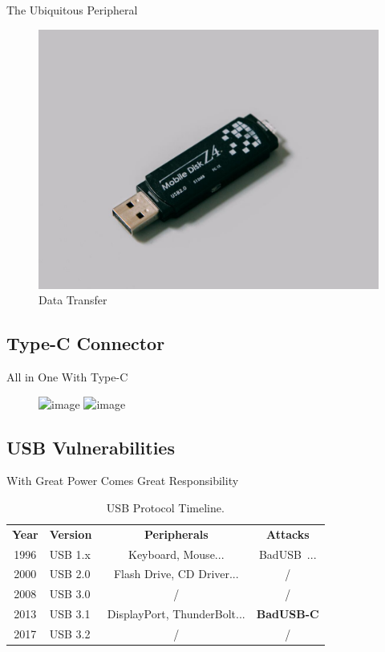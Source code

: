 \documentclass{beamer}
\begin{document}
\begin{frame}{The Ubiquitous Peripheral}
	\begin{figure}[htbp]
		\includegraphics[width=.7\textwidth]{Figs/flashdrive.jpg}
		\caption*{Data Transfer}
	\end{figure}
\end{frame}
\subsection{Type-C Connector}
\begin{frame}{All in One With Type-C}
\begin{figure}[htbp]
	\includegraphics<1>[width=.8\textwidth]{Figs/messy_cables.png}
	\includegraphics<2>[width=.8\textwidth]{Figs/usbc_top.jpg}
\end{figure}
\end{frame}
\subsection{USB Vulnerabilities}
\begin{frame}{With Great Power Comes Great Responsibility}
	\begin{table}
		\begin{tabular}{c|l|c|c}
			\textbf{Year} & \textbf{Version} & \textbf{Peripherals} & \textbf{Attacks} \\
			1996 & USB 1.x~\cite{usb10,usb11} & Keyboard, Mouse... & BadUSB~\cite{badusb}... \\
			2000 & USB 2.0~\cite{usb20} & Flash Drive, CD Driver... & / \\
			2008 & USB 3.0~\cite{usb30} & /  & / \\
			2013 & USB 3.1~\cite{usb31} &  DisplayPort, ThunderBolt...  & \textbf{BadUSB-C} \\
			2017 & USB 3.2~\cite{usb32} & /  & / \\
		\end{tabular}
		\linebreak
		\caption*{USB Protocol Timeline.}
	\end{table}
\end{frame}
\end{document}
